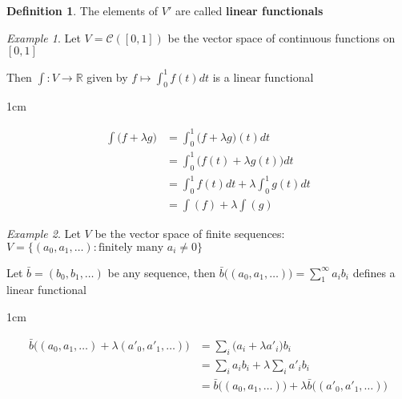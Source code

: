 \documentclass[11pt, a4paper]{report}
\makeatletter
\numberwithin{equation}{section}
\newcommand{\R}{\mathbb{R}}
\newcommand{\tint}{\textstyle{\int}}
\numberwithin{equation}{subsection}
\theoremstyle{plain}
\theoremstyle{definition}
\newtheorem{defn}{Definition}[chapter]
\theoremstyle{remark}
\newtheorem{exmp}{Example}[chapter]
\newtheorem*{prf}{Proof}
\renewenvironment{prf}[1][\proofname]{\par
  \vspace{-\topsep}%
  \normalfont
  \topsep0pt \partopsep0pt %
  \trivlist
  \item[\hskip\labelsep
        \itshape
    #1\@addpunct{.}]\ignorespaces
}{%
  \popQED\endtrivlist\@endpefalse
  \addvspace{6pt plus 6pt} %
}
\newcommand{\pr}[1]{\begin{adjustwidth}{1cm}{} \begin{prf} #1 \end{prf} \end{adjustwidth}}
\makeatother
\begin{document}
\begin{defn}
The elements of $V'$ are called \textbf{linear functionals}
\end{defn}

\begin{exmp}
Let $V = \mathcal{C}([0,1])$ be the vector space of continuous functions on $[0,1]$

Then $\int: V \to \R$ given by $f \mapsto \int_0^1 f(t) dt$ is a linear functional
\pr{
\begin{align*}
\tint \big( f + \lambda g \big) &= \int_0^1 \big( f + \lambda g \big) (t) dt \\
					&= \int_0^1 \big( f(t) + \lambda g(t) \big) dt \\
					&= \int_0^1 f(t) dt + \lambda \int_0^1 g(t) dt \\
					&= \tint(f) + \lambda \tint(g)
\end{align*}
}
\end{exmp}

\begin{exmp}
Let $V$ be the vector space of finite sequences: $V = \{ (a_0, a_1, \ldots) : \text{finitely many } a_i \neq 0 \}$

Let $\bar{b} = (b_0, b_1, \ldots)$ be any sequence, then $\bar{b} \big( (a_0, a_1, \ldots) \big) = \sum_1^\infty a_ib_i$ defines a linear functional
\pr{
\begin{align*}
\bar{b} \big( (a_0, a_1, \ldots) + \lambda(a'_0, a'_1, \ldots) \big)
	&= \sum_i \big( a_i + \lambda a'_i \big) b_i \\
	&= \sum_i a_i b_i + \lambda \sum_i a'_i b_i \\
	&= \bar{b} \big( (a_0, a_1, \ldots) \big) + \lambda \bar{b} \big( (a'_0, a'_1, \ldots) \big)
\end{align*}
}
\end{exmp}

\newpage
\end{document}
